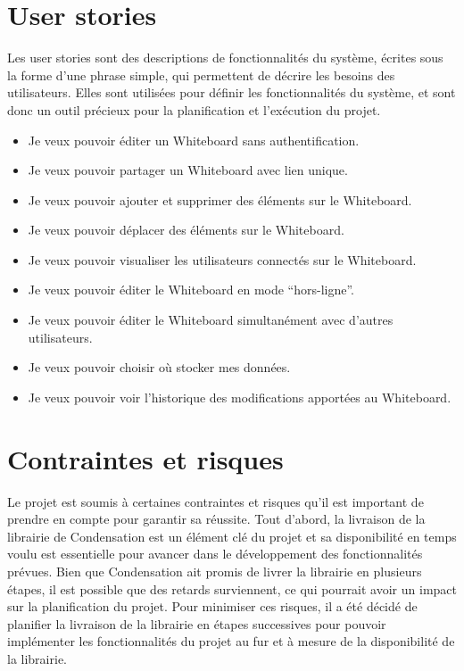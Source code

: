 \section*{User stories \label{sec:user-stories}}
Les user stories sont des descriptions de fonctionnalités du système, écrites sous la forme d'une phrase simple, qui permettent de décrire les besoins des utilisateurs. Elles sont utilisées pour définir les fonctionnalités du système, et sont donc un outil précieux pour la planification et l'exécution du projet.
\begin{itemize}
    \item Je veux pouvoir éditer un Whiteboard sans authentification.
    \item Je veux pouvoir partager un Whiteboard avec lien unique.
    \item Je veux pouvoir ajouter et supprimer des éléments sur le Whiteboard.
    \item Je veux pouvoir déplacer des éléments sur le Whiteboard.
    \item Je veux pouvoir visualiser les utilisateurs connectés sur le Whiteboard.
    \item Je veux pouvoir éditer le Whiteboard en mode “hors-ligne”.
    \item Je veux pouvoir éditer le Whiteboard simultanément avec d'autres utilisateurs.
    \item Je veux pouvoir choisir où stocker mes données.
    \item Je veux pouvoir voir l'historique des modifications apportées au Whiteboard.
\end{itemize}

\section*{Contraintes et risques}
Le projet est soumis à certaines contraintes et risques qu'il est important de prendre en compte pour garantir sa réussite.
Tout d'abord, la livraison de la librairie de Condensation est un élément clé du projet et sa disponibilité en temps voulu est essentielle pour avancer dans le développement des fonctionnalités prévues. 
Bien que Condensation ait promis de livrer la librairie en plusieurs étapes, il est possible que des retards surviennent, ce qui pourrait avoir un impact sur la planification du projet.
Pour minimiser ces risques, il a été décidé de planifier la livraison de la librairie en étapes successives pour pouvoir implémenter les fonctionnalités du projet au fur et à mesure de la disponibilité de la librairie.
